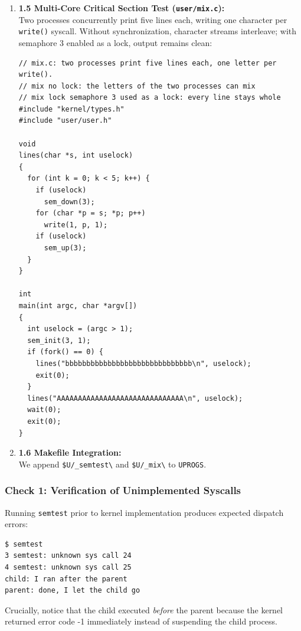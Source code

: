 \documentclass{labreport}
\begin{document}
\begin{enumerate}[leftmargin=*]
\begin{lstlisting}[style=c]
int
main(void)
{
  // Test 1: order. Semaphore 0 starts at 0, so the child must wait.
  sem_init(0, 0);
  if (fork() == 0) {
    sem_down(0);
    printf("child: I ran after the parent\n");
    exit(0);
  }
  pause(10);
  printf("parent: done, I let the child go\n");
  sem_up(0);
  wait(0);

  // Test 2: ping-pong. Semaphore 1 = ping's turn, semaphore 2 = pong's turn.
  sem_init(1, 1);
  sem_init(2, 0);
  if (fork() == 0) {
    for (int i = 1; i <= 3; i++) {
      sem_down(2);
      printf(" pong %d\n", i);
      sem_up(1);
    }
    exit(0);
  }
  for (int i = 1; i <= 3; i++) {
    sem_down(1);
    printf("ping %d\n", i);
    sem_up(2);
  }
  wait(0);
  printf("semtest: OK\n");
  exit(0);
}
\end{lstlisting}

    \item \textbf{1.5 Multi-Core Critical Section Test (\texttt{user/mix.c}):}\\
    Two processes concurrently print five lines each, writing one character per \texttt{write()} syscall. Without synchronization, character streams interleave; with semaphore 3 enabled as a lock, output remains clean:

\begin{lstlisting}[style=c]
// mix.c: two processes print five lines each, one letter per write().
// mix no lock: the letters of the two processes can mix
// mix lock semaphore 3 used as a lock: every line stays whole
#include "kernel/types.h"
#include "user/user.h"

void
lines(char *s, int uselock)
{
  for (int k = 0; k < 5; k++) {
    if (uselock)
      sem_down(3);
    for (char *p = s; *p; p++)
      write(1, p, 1);
    if (uselock)
      sem_up(3);
  }
}

int
main(int argc, char *argv[])
{
  int uselock = (argc > 1);
  sem_init(3, 1);
  if (fork() == 0) {
    lines("bbbbbbbbbbbbbbbbbbbbbbbbbbbbbb\n", uselock);
    exit(0);
  }
  lines("AAAAAAAAAAAAAAAAAAAAAAAAAAAAAA\n", uselock);
  wait(0);
  exit(0);
}
\end{lstlisting}

    \item \textbf{1.6 Makefile Integration:}\\
    We append \texttt{\$U/\_semtest\textbackslash} and \texttt{\$U/\_mix\textbackslash} to \texttt{UPROGS}.
\end{enumerate}

\subsubsection{Check 1: Verification of Unimplemented Syscalls}
Running \texttt{semtest} prior to kernel implementation produces expected dispatch errors:
\begin{lstlisting}[style=bash]
$ semtest
3 semtest: unknown sys call 24
4 semtest: unknown sys call 25
child: I ran after the parent
parent: done, I let the child go
\end{lstlisting}
Crucially, notice that the child executed \emph{before} the parent because the kernel returned error code -1 immediately instead of suspending the child process.
\end{document}
